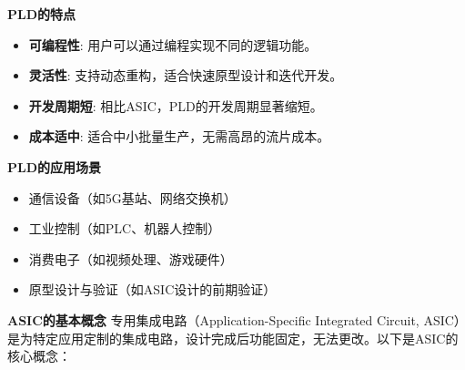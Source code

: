 \documentclass[
  ignorenonframetext,
  chinese,
]{beamer}
\providecommand{\tightlist}{%
  \setlength{\itemsep}{0pt}\setlength{\parskip}{0pt}}
\begin{document}
\begin{frame}
\begin{block}{\textbf{PLD的特点}}
\label{pldux7684ux7279ux70b9}
\begin{itemize}
\tightlist
\item
  \textbf{可编程性}: 用户可以通过编程实现不同的逻辑功能。\\
\item
  \textbf{灵活性}: 支持动态重构，适合快速原型设计和迭代开发。\\
\item
  \textbf{开发周期短}: 相比ASIC，PLD的开发周期显著缩短。\\
\item
  \textbf{成本适中}: 适合中小批量生产，无需高昂的流片成本。
\end{itemize}
\end{block}
\end{frame}

\begin{frame}
\begin{block}{\textbf{PLD的应用场景}}
\label{pldux7684ux5e94ux7528ux573aux666f}
\begin{itemize}
\tightlist
\item
  通信设备（如5G基站、网络交换机）\\
\item
  工业控制（如PLC、机器人控制）\\
\item
  消费电子（如视频处理、游戏硬件）\\
\item
  原型设计与验证（如ASIC设计的前期验证）
\end{itemize}
\end{block}
\end{frame}

\begin{frame}{\textbf{ASIC的基本概念}}
\label{asicux7684ux57faux672cux6982ux5ff5}
专用集成电路（Application-Specific Integrated Circuit,
ASIC）是为特定应用定制的集成电路，设计完成后功能固定，无法更改。以下是ASIC的核心概念：
\end{frame}
\end{document}
